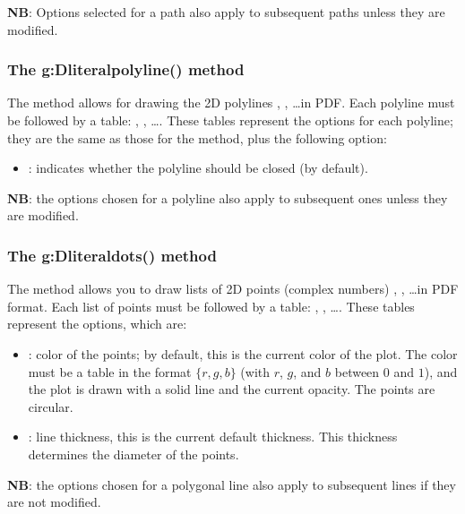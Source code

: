 \textbf{NB}: Options selected for a path also apply to subsequent paths unless they are modified.

\subsubsection{The g:Dliteralpolyline() method}

The  method allows for drawing the 2D polylines , , \ldots in PDF. Each polyline must be followed by a table: , , \ldots. These tables represent the options for each polyline; they are the same as those for the  method, plus the following option:
\begin{itemize}
    \item {}: indicates whether the polyline should be closed (\false by default). 
\end{itemize}

\textbf{NB}: the options chosen for a polyline also apply to subsequent ones unless they are modified.

\subsubsection{The g:Dliteraldots() method}

The  method allows you to draw lists of 2D points (complex numbers) , , \ldots in PDF format. Each list of points must be followed by a table: , , \ldots. These tables represent the options, which are:

\begin{itemize}
    \item {}: color of the points; by default, this is the current color of the plot. The color must be a table in the format $\{r,g,b\}$ (with $r$, $g$, and $b$ between $0$ and $1$), and the plot is drawn with a solid line and the current opacity. The points are circular.

    \item {}: line thickness, this is the current default thickness. This thickness determines the diameter of the points.
\end{itemize}

\textbf{NB}: the options chosen for a polygonal line also apply to subsequent lines if they are not modified.

